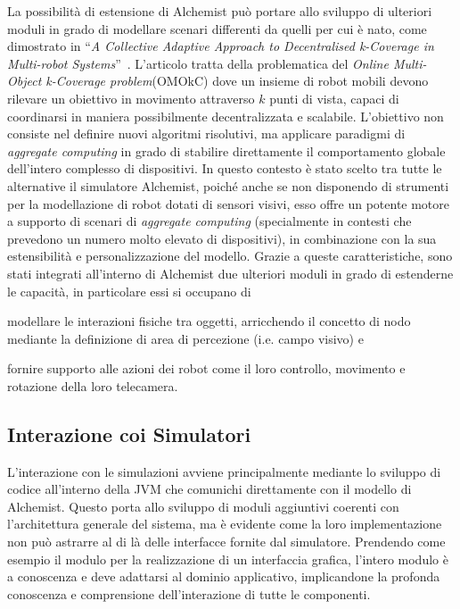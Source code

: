 La possibilità di estensione di Alchemist può portare allo sviluppo di ulteriori moduli in grado di modellare scenari differenti
da quelli per cui è nato, come dimostrato in ``\textit{A Collective Adaptive Approach to Decentralised k-Coverage in Multi-robot Systems}''~\cite{OMOkC}.
L'articolo tratta della problematica del \textit{Online Multi-Object k-Coverage problem}(OMOkC) dove un insieme di robot mobili
devono rilevare un obiettivo in movimento attraverso $k$ punti di vista, capaci di coordinarsi in maniera possibilmente decentralizzata
e scalabile. L'obiettivo non consiste nel definire nuovi algoritmi risolutivi, ma applicare paradigmi di \textit{aggregate computing}
in grado di stabilire direttamente il comportamento globale dell'intero complesso di dispositivi. In questo contesto è stato
scelto tra tutte le alternative il simulatore Alchemist, poiché anche se non disponendo di strumenti per la modellazione di
robot dotati di sensori visivi, esso offre un potente motore a supporto di scenari di \textit{aggregate computing} (specialmente
in contesti che prevedono un numero molto elevato di dispositivi), in combinazione con la sua estensibilità e personalizzazione del modello.
Grazie a queste caratteristiche, sono stati integrati all'interno di Alchemist due ulteriori moduli in grado di estenderne
le capacità, in particolare essi si occupano di 
\begin{enumerate*}[label=(\roman*)]
    \item modellare le interazioni fisiche tra oggetti, arricchendo il concetto di nodo mediante la definizione di area di percezione (i.e. campo visivo) e
    \item fornire supporto alle azioni dei robot come il loro controllo, movimento e rotazione della loro telecamera.
\end{enumerate*}

\subsection{Interazione coi Simulatori}\label{ssec:sim-interactions}
L'interazione con le simulazioni avviene principalmente mediante lo sviluppo di codice all'interno della \ac{JVM} che comunichi direttamente con il modello di Alchemist.
Questo porta allo sviluppo di moduli aggiuntivi coerenti con l'architettura generale del sistema, ma è evidente come la loro implementazione non può astrarre al di là delle interfacce fornite
dal simulatore. Prendendo come esempio il modulo per la realizzazione di un interfaccia grafica, l'intero modulo è a conoscenza e deve adattarsi al dominio applicativo, implicandone 
la profonda conoscenza e comprensione dell'interazione di tutte le componenti.

